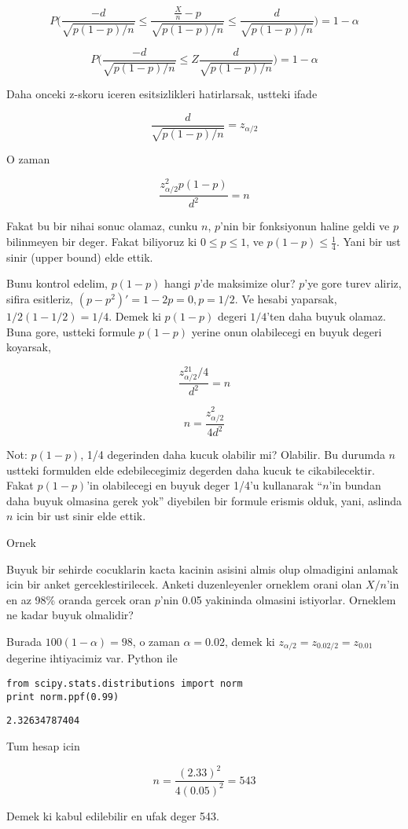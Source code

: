 \documentclass[12pt,fleqn]{article}\usepackage{../common}
\begin{document}
$$ P\bigg( 
\frac{-d}{\sqrt{p(1-p)/n}} \le 
\frac{\frac{X}{n} - p }{\sqrt{p(1-p)/n}}\le 
\frac{d}{\sqrt{p(1-p)/n}} 
\bigg)  = 
1-\alpha$$


$$ P\bigg( 
\frac{-d}{\sqrt{p(1-p)/n}} \le 
Z
\frac{d}{\sqrt{p(1-p)/n}} 
\bigg)  = 
1-\alpha$$

Daha onceki z-skoru iceren esitsizlikleri hatirlarsak, ustteki ifade 

$$ \frac{d}{\sqrt{p(1-p)/n}} = z_{\alpha/2} 
$$

O zaman 

$$ \frac{z_{\alpha/2}^2p(1-p)}{d^2} = n $$

Fakat bu bir nihai sonuc olamaz, cunku $n$, $p$'nin bir fonksiyonun haline
geldi ve $p$ bilinmeyen bir deger. Fakat biliyoruz ki $0 \le p \le 1$, ve
$p(1-p) \le \frac{1}{4}$. Yani bir ust sinir (upper bound) elde ettik. 

Bunu kontrol edelim, $p(1-p)$ hangi $p$'de maksimize olur? $p$'ye gore
turev aliriz, sifira esitleriz, $(p-p^2)' = 1 - 2p = 0, p=1/2$. Ve hesabi
yaparsak, $1/2(1-1/2)=1/4$. Demek ki $p(1-p)$ degeri $1/4$'ten daha buyuk
olamaz. Buna gore, ustteki formule $p(1-p)$ yerine onun olabilecegi en
buyuk degeri koyarsak, 

$$ \frac{z_{\alpha/2}^21/4}{d^2} = n $$

$$ n = \frac{z_{\alpha/2}^2}{4d^2} $$


Not: $p(1-p)$, 1/4 degerinden daha kucuk olabilir mi? Olabilir. Bu durumda
$n$ ustteki formulden elde edebilecegimiz degerden daha kucuk te
cikabilecektir. Fakat $p(1-p)$'in olabilecegi en buyuk deger 1/4'u
kullanarak ``$n$'in bundan daha buyuk olmasina gerek yok'' diyebilen bir
formule erismis olduk, yani, aslinda $n$ icin bir ust sinir elde ettik. 


Ornek

Buyuk bir sehirde cocuklarin kacta kacinin asisini almis olup olmadigini
anlamak icin bir anket gerceklestirilecek. Anketi duzenleyenler orneklem
orani olan $X/n$'in en az 98\% oranda gercek oran $p$'nin 0.05 yakininda
olmasini istiyorlar. Orneklem ne kadar buyuk olmalidir? 

Burada $100(1-\alpha) = 98$, o zaman $\alpha = 0.02$, demek ki $z_{\alpha/2}
= z_{0.02/2} = z_{0.01}$ 
degerine ihtiyacimiz var. Python ile

\begin{verbatim}
from scipy.stats.distributions import norm
print norm.ppf(0.99)
\end{verbatim}

\begin{verbatim}
2.32634787404
\end{verbatim}

Tum hesap icin

$$ n = \frac{(2.33)^2}{4(0.05)^2} = 543$$

Demek ki kabul edilebilir en ufak deger 543. 
\end{document}
